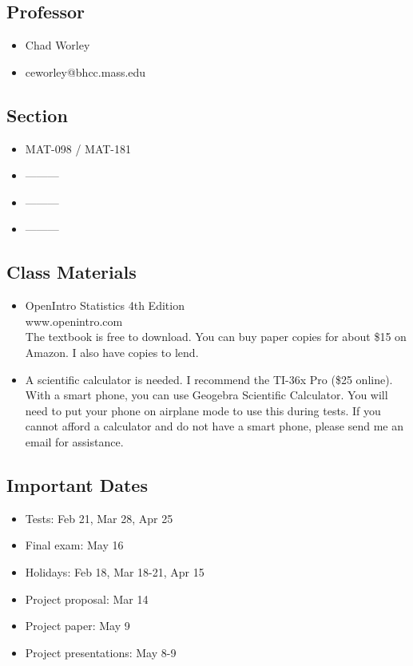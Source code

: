 \documentclass[12pt,letterpaper]{article}
\begin{document}
\subsection*{Professor}
\begin{itemize}
\item Chad Worley 
\item ceworley@bhcc.mass.edu
\end{itemize}
\subsection*{Section}
\begin{itemize}
\item MAT-098 / MAT-181
\item ---------
\item ---------
\item ---------
\end{itemize}


\subsection*{Class Materials}
\begin{itemize}
\item OpenIntro Statistics 4th Edition
\\ www.openintro.com
\\ The textbook is free to download. You can buy paper copies for about \$15 on Amazon. I also have copies to lend.
\item A scientific calculator is needed. I recommend the TI-36x Pro (\$25 online). With a smart phone, you can use Geogebra Scientific Calculator. You will need to put your phone on airplane mode to use this during tests. If you cannot afford a calculator and do not have a smart phone, please send me an email for assistance.
\end{itemize}

\subsection*{Important Dates}
\begin{itemize}
\item Tests: Feb 21, Mar 28, Apr 25
\item Final exam: May 16
\item Holidays: Feb 18, Mar 18-21, Apr 15
\item Project proposal: Mar 14
\item Project paper: May 9
\item Project presentations: May 8-9
\end{itemize}
\end{document}
